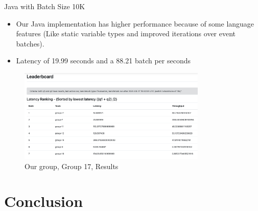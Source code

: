 \documentclass[9pt]{beamer}
\begin{document}
\begin{frame}[fragile]{Java with Batch Size 10K  }
    \begin{itemize}
        \item Our Java implementation has higher performance because of some language features (Like static variable types and improved iterations over event batches).
        \item Latency of 19.99 seconds and a 88.21 batch per seconds
    \end{itemize}

    

    
    \begin{figure}[]
        \begin{center}
            \includegraphics[width=0.8\textwidth]{../DEBS2022-2022-05-28-Throuput.png}
            \caption{Our group, Group 17, Results }
            \label{fig:evaluation}
        \end{center}
    \end{figure}
    
\end{frame}





\section{Conclusion}




\end{document}
